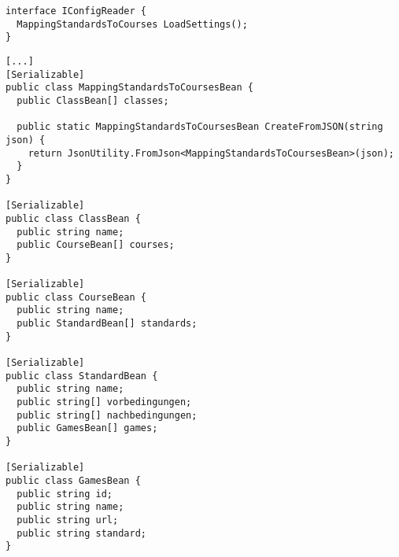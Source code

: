 \begin{scriptsize}
				\lstset{
					float,
					caption=Interface: IConfigReader.cs, 
					language=[Sharp]C, 
					frame=single,  
					showstringspaces=false, 
					showspaces=false, 
					numbers=left, 
					captionpos=b, 
					belowcaptionskip=4pt,
					basicstyle=\ttfamily
				} 
				\begin{lstlisting}[label=lst:methode35]
interface IConfigReader {
  MappingStandardsToCourses LoadSettings();
}
				\end{lstlisting}
			\end{scriptsize}
			
\begin{scriptsize}
				\lstset{
					float,
					caption=Skript: MappingStandardsToCoursesBean.cs, 
					language=[Sharp]C, 
					frame=single,  
					showstringspaces=false, 
					showspaces=false, 
					numbers=left, 
					captionpos=b, 
					belowcaptionskip=4pt,
					basicstyle=\ttfamily
				} 
				\begin{lstlisting}[label=lst:methode3]
[...]
[Serializable]
public class MappingStandardsToCoursesBean {
  public ClassBean[] classes;

  public static MappingStandardsToCoursesBean CreateFromJSON(string json) {
    return JsonUtility.FromJson<MappingStandardsToCoursesBean>(json);
  }
}

[Serializable]
public class ClassBean {
  public string name;
  public CourseBean[] courses;
}

[Serializable]
public class CourseBean {
  public string name;
  public StandardBean[] standards;
}

[Serializable]
public class StandardBean {
  public string name;
  public string[] vorbedingungen;
  public string[] nachbedingungen;
  public GamesBean[] games;
}

[Serializable]
public class GamesBean {
  public string id;
  public string name;
  public string url;
  public string standard;
}
				\end{lstlisting}
			\end{scriptsize}

